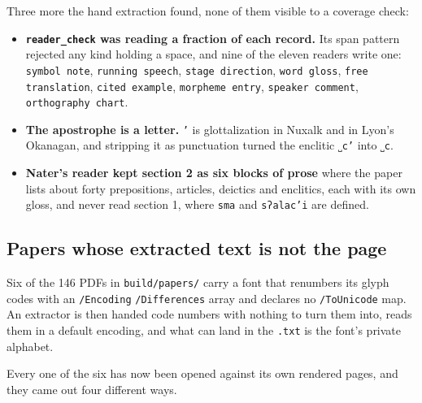 Three more the hand extraction found, none of them visible to a coverage check:

\begin{itemize}
\item \textbf{\texttt{reader\_\allowbreak{}check} was reading a fraction of each record.} Its span pattern rejected any kind holding a space, and nine of the eleven readers write one: \texttt{symbol note}, \texttt{running speech}, \texttt{stage direction}, \texttt{word gloss}, \texttt{free translation}, \texttt{cited example}, \texttt{morpheme entry}, \texttt{speaker comment}, \texttt{orthography chart}.
\item \textbf{The apostrophe is a letter.} \texttt{’} is glottalization in Nuxalk and in Lyon's Okanagan, and stripping it as punctuation turned the enclitic \texttt{˽c’} into \texttt{˽c}.
\item \textbf{Nater's reader kept section 2 as six blocks of prose} where the paper lists about forty prepositions, articles, deictics and enclitics, each with its own gloss, and never read section 1, where \texttt{sma} and \texttt{sʔalac’i} are defined.
\end{itemize}

\subsection{Papers whose extracted text is not the page}

Six of the 146 PDFs in \texttt{build/\allowbreak{}papers/\allowbreak{}} carry a font that renumbers its glyph codes with an \texttt{/\allowbreak{}Encoding} \texttt{/\allowbreak{}Differences} array and declares no \texttt{/\allowbreak{}To\allowbreak{}Unicode} map. An extractor is then handed code numbers with nothing to turn them into, reads them in a default encoding, and what can land in the \texttt{.\allowbreak{}txt} is the font's private alphabet.

Every one of the six has now been opened against its own rendered pages, and they came out four different ways.

